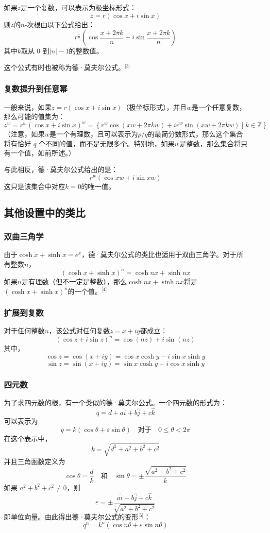 如果\( z \)是一个复数，可以表示为极坐标形式：
\[
z = r \left( \cos x + i \sin x \right)~
\]
则\( z \)的\( n \)-次根由以下公式给出：
\[
r^{\frac{1}{n}} \left( \cos \frac{x + 2\pi k}{n} + i \sin \frac{x + 2\pi k}{n} \right)~
\]
其中\( k \)取从 0 到\( |n| - 1 \)的整数值。

这个公式有时也被称为德·莫夫尔公式。\(^\text{[3]}\)
\subsubsection{复数提升到任意幂}  
一般来说，如果\(z = r (\cos x + i \sin x)\)（极坐标形式），并且\(w\)是一个任意复数，那么可能的值集为：
\[
z^w = r^w \left( \cos x + i \sin x \right)^w = \left\{ r^w \cos \left( xw + 2\pi kw \right) + i r^w \sin \left( xw + 2\pi kw \right) \mid k \in \mathbb{Z} \right\}~
\]
（注意，如果\( w \)是一个有理数，且可以表示为\(p/q\)的最简分数形式，那么这个集合将有恰好 \( q \) 个不同的值，而不是无限多个。特别地，如果\( w \)是整数，那么集合将只有一个值，如前所述。）  

与此相反，德·莫夫尔公式给出的是：
\[
r^w (\cos xw + i \sin xw)~
\]
这只是该集合中对应\( k = 0 \)的唯一值。
\subsection{其他设置中的类比}  
\subsubsection{双曲三角学}  
由于\( \cosh x + \sinh x = e^x \)，德·莫夫尔公式的类比也适用于双曲三角学。对于所有整数\(n\)，
\[
(\cosh x + \sinh x)^n = \cosh nx + \sinh nx~
\]
如果\( n \)是有理数（但不一定是整数），那么\(\cosh nx + \sinh nx\)将是\( (\cosh x + \sinh x)^n \)的一个值。\(^\text{[4]}\)
\subsubsection{扩展到复数}  
对于任何整数\( n \)，该公式对任何复数\( z = x + iy \)都成立：
\[
(\cos z + i \sin z)^n = \cos(nz) + i \sin(nz)~
\]
其中，
\[
\cos z = \cos(x + iy) = \cos x \cosh y - i \sin x \sinh y~
\]
\[
\sin z = \sin(x + iy) = \sin x \cosh y + i \cos x \sinh y~
\]
\subsubsection{四元数}  
为了求四元数的根，有一个类似的德·莫夫尔公式。一个四元数的形式为：
\[
q = d + a\hat{i} + b\hat{j} + c\hat{k}~
\]
可以表示为
\[
q = k (\cos \theta + \varepsilon \sin \theta) \quad \text{对于} \quad 0 \leq \theta < 2\pi~
\]
在这个表示中，
\[
k = \sqrt{d^2 + a^2 + b^2 + c^2}~
\]
并且三角函数定义为
\[
\cos \theta = \frac{d}{k} \quad \text{和} \quad \sin \theta = \pm \frac{\sqrt{a^2 + b^2 + c^2}}{k}~
\]
如果 \( a^2 + b^2 + c^2 \neq 0 \)，则
\[
\varepsilon = \pm \frac{a \hat{i} + b \hat{j} + c \hat{k}}{\sqrt{a^2 + b^2 + c^2}}~
\]
即单位向量。由此得出德·莫夫尔公式的变形\(^\text{[5]}\)：
\[
q^n = k^n (\cos n\theta + \varepsilon \sin n\theta)~
\]

